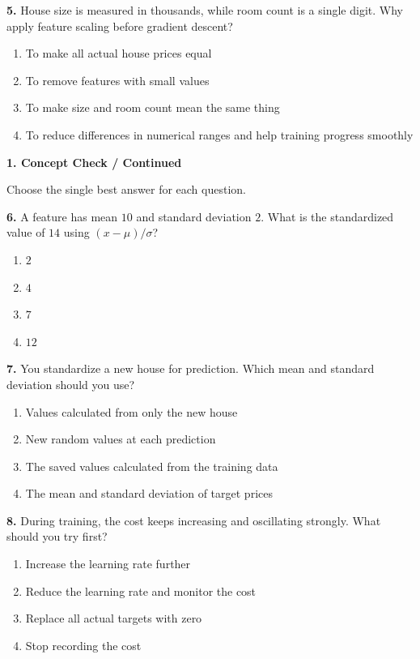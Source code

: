 \documentclass[11pt,a4paper]{article}
\newcommand{\parttitle}[2]{{\large\bfseries\color{ink} #1}\par{\small #2}\par\vspace{5mm}}
\newcommand{\question}[2]{\textbf{#1.} #2\par}
\begin{document}
\question{5}{House size is measured in thousands, while room count is a single digit. Why apply feature scaling before gradient descent?}
\begin{enumerate}[label=(\arabic*),leftmargin=9mm,itemsep=0pt,topsep=2pt,parsep=0pt]
\item To make all actual house prices equal
\item To remove features with small values
\item To make size and room count mean the same thing
\item To reduce differences in numerical ranges and help training progress smoothly
\end{enumerate}\vfill
\newpage
\parttitle{1. Concept Check / Continued}{Choose the single best answer for each question.}
\question{6}{A feature has mean $10$ and standard deviation $2$. What is the standardized value of $14$ using $(x-\mu)/\sigma$?}
\begin{enumerate}[label=(\arabic*),leftmargin=9mm,itemsep=0pt,topsep=2pt,parsep=0pt]
\item $2$
\item $4$
\item $7$
\item $12$
\end{enumerate}\vfill
\question{7}{You standardize a new house for prediction. Which mean and standard deviation should you use?}
\begin{enumerate}[label=(\arabic*),leftmargin=9mm,itemsep=0pt,topsep=2pt,parsep=0pt]
\item Values calculated from only the new house
\item New random values at each prediction
\item The saved values calculated from the training data
\item The mean and standard deviation of target prices
\end{enumerate}\vfill
\question{8}{During training, the cost keeps increasing and oscillating strongly. What should you try first?}
\begin{enumerate}[label=(\arabic*),leftmargin=9mm,itemsep=0pt,topsep=2pt,parsep=0pt]
\item Increase the learning rate further
\item Reduce the learning rate and monitor the cost
\item Replace all actual targets with zero
\item Stop recording the cost
\end{enumerate}\vfill
\end{document}
